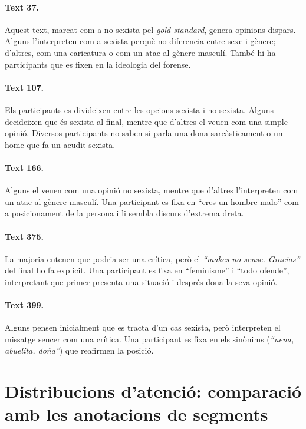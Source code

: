 \paragraph{Text 37.}
Aquest text, marcat com a no sexista pel \textit{gold standard}, genera opinions dispars.
Alguns l'interpreten com a sexista perquè no diferencia entre sexe i gènere; d'altres, com una caricatura o com un atac al gènere masculí. També hi ha participants que es fixen en la ideologia del forense.

\paragraph{Text 107.}
Els participants es divideixen entre les opcions sexista i no sexista.
Alguns decideixen que és sexista al final, mentre que d'altres el veuen com una simple opinió.
Diversos participants no saben si parla una dona sarcàsticament o un home que fa un acudit sexista.

\paragraph{Text 166.}
Alguns el veuen com una opinió no sexista, mentre que d'altres l'interpreten com un atac al gènere masculí.
Una participant es fixa en ``eres un hombre malo'' com a posicionament de la persona i li sembla discurs d'extrema dreta.

\paragraph{Text 375.}
La majoria entenen que podria ser una crítica, però el \textit{``makes no sense. Gracias''} del final ho fa explícit.
Una participant es fixa en ``feminisme'' i ``todo ofende'', interpretant que primer presenta una situació i després dona la seva opinió.

\paragraph{Text 399.}
Alguns pensen inicialment que es tracta d'un cas sexista, però interpreten el missatge sencer com una crítica.
Una participant es fixa en els sinònims (\textit{``nena, abuelita, doña''}) que reafirmen la posició.


\section{Distribucions d'atenció: comparació amb les anotacions de segments}

